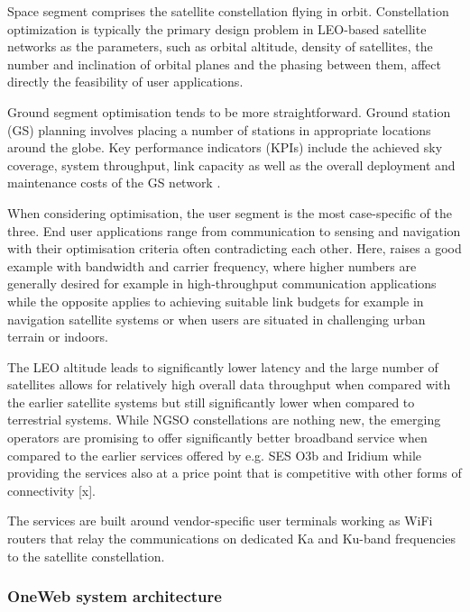 \documentclass[english, 12pt, a4paper, elec, utf8, a-1b, online]{aaltothesis}
\begin{document}
Space segment comprises the satellite constellation flying in orbit.
Constellation optimization is typically the primary design problem in LEO-based satellite networks as the parameters, such as orbital altitude, density of satellites, the number and inclination of orbital planes and the phasing between them, affect directly the feasibility of user applications.%

Ground segment optimisation tends to be more straightforward.
Ground station (GS) planning involves placing a number of stations in appropriate locations around the globe.
Key performance indicators (KPIs) include the achieved sky coverage, system throughput, link capacity as well as the overall deployment and maintenance costs of the GS network \cite{celikbilek2022survey}.

When considering optimisation, the user segment is the most case-specific of the three.
End user applications range from communication to sensing and navigation with their optimisation criteria often contradicting each other.
Here, \cite{celikbilek2022survey} raises a good example with bandwidth and carrier frequency, where higher numbers are generally desired for example in high-throughput communication applications while the opposite applies to achieving suitable link budgets for example in navigation satellite systems or when users are situated in challenging urban terrain or indoors.

The LEO altitude leads to significantly lower latency and the large number of satellites allows for relatively high overall data throughput when compared with the earlier satellite systems but still significantly lower when compared to terrestrial systems.
While NGSO constellations are nothing new, the emerging operators are promising to offer significantly better broadband service when compared to the earlier services offered by e.g. SES O3b and Iridium while providing the services also at a price point that is competitive with other forms of connectivity [x]. %

The services are built around vendor-specific user terminals working as WiFi routers that relay the communications on dedicated Ka and Ku-band frequencies to the satellite constellation. %

\subsubsection{OneWeb system architecture} \label{ch-oneweb}
\end{document}
